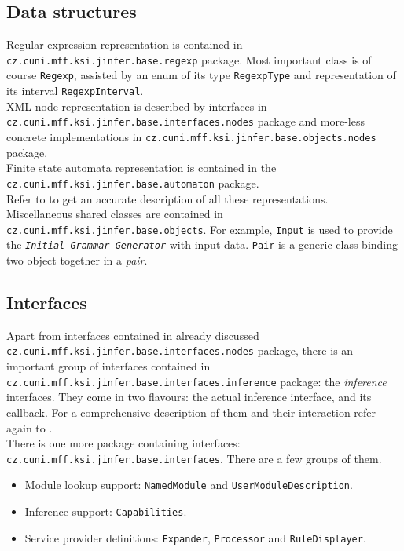 \documentclass[a4paper,10pt,oneside]{article}
\newcommand{\code}[1]{\texttt{#1}}
\newcommand{\jmodule}[1]{\texttt{\textit{#1}}}
\begin{document}
\subsection{Data structures}

Regular expression representation is contained in \code{cz.cuni.mff.ksi.jinfer.base.regexp} package. Most important class is of course \code{Regexp}, assisted by an enum of its type \code{RegexpType} and representation of its interval \code{RegexpInterval}.\\
XML node representation is described by interfaces in \code{cz.cuni.mff.ksi.jinfer.base.interfaces.nodes} package and more-less concrete implementations in \code{cz.cuni.mff.ksi.jinfer.base.objects.nodes} package.\\
Finite state automata representation is contained in the \code{cz.cuni.mff.ksi.jinfer.base.automaton} package.\\
Refer to \cite{archdoc} to get an accurate description of all these representations.\\

Miscellaneous shared classes are contained in \code{cz.cuni.mff.ksi.jinfer.base.objects}. For example, \code{Input} is used to provide the \jmodule{Initial Grammar Generator} with input data. \code{Pair} is a generic class binding two object together in a \emph{pair}.

\subsection{Interfaces}

Apart from interfaces contained in already discussed \code{cz.cuni.mff.ksi.jinfer.base.interfaces.nodes} package, there is an important group of interfaces contained in \code{cz.cuni.mff.ksi.jinfer.base.interfaces.inference} package: the \emph{inference} interfaces. They come in two flavours: the actual inference interface, and its callback. For a comprehensive description of them and their interaction refer again to \cite{archdoc}.\\

There is one more package containing interfaces: \code{cz.cuni.mff.ksi.jinfer.base.interfaces}. There are a few groups of them.
\begin{itemize}
	\item Module lookup support: \code{NamedModule} and \code{UserModuleDescription}.
	\item Inference support: \code{Capabilities}.
	\item Service provider definitions: \code{Expander}, \code{Processor} and \code{RuleDisplayer}.
\end{itemize}
\end{document}
